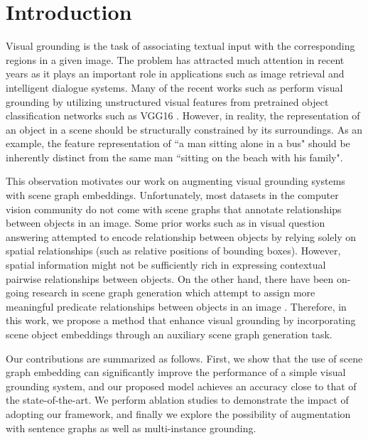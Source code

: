 \section{Introduction}
Visual grounding is the task of associating textual input with the corresponding regions in a given image. The problem has attracted much attention in recent years as it plays an important role in applications such as image retrieval and intelligent dialogue systems. Many of the recent works such as \cite{rohrbach2016grounding, deng2018visual} perform visual grounding by utilizing unstructured visual features from pretrained object classification networks such as VGG16 \cite{simonyan2014very}. However, in reality, the representation of an object in a scene should be structurally constrained by its surroundings. As an example, the feature representation of ``a man sitting alone in a bus" should be inherently distinct from the same man ``sitting on the beach with his family". 

This observation motivates our work on augmenting visual grounding systems with scene graph embeddings. Unfortunately, most datasets in the computer vision community do not come with scene graphs that annotate relationships between objects in an image. Some prior works such as \cite{teney2017graph} in visual question answering attempted to encode relationship between objects by relying solely on spatial relationships (such as relative positions of bounding boxes). However, spatial information might not be sufficiently rich in expressing contextual pairwise relationships between objects. On the other hand, there have been on-going research in scene graph generation which attempt to assign more meaningful predicate relationships between objects in an image \cite{xu2017scene, zhang2017relationship, yang2018graph, NIPS2018_7951, gu2019scene} . Therefore, in this work, we propose a method that enhance visual grounding by incorporating scene object embeddings through an auxiliary scene graph generation task. 

Our contributions are summarized as follows. First, we show that the use of scene graph embedding can significantly improve the performance of a simple visual grounding system, and our proposed model achieves an accuracy close to that of the state-of-the-art. We perform ablation studies to demonstrate the impact of adopting our framework, and finally we explore the possibility of augmentation with sentence graphs as well as multi-instance grounding.